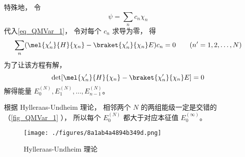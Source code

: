 特殊地， 令
\begin{equation}
\psi = \sum_n c_n \chi_n
\end{equation}
代入\autoref{eq_QMVar_1}， 令对每个 $c_n$ 求导为零， 得
\begin{equation}
\sum_n (\mel{\chi_n'}{H}{\chi_n} - \braket{\chi_n'}{\chi_n}E)c_n = 0 \qquad (n' = 1,2,\dots,N)
\end{equation}
为了让该方程有解，
\begin{equation}
\det[\mel{\chi_n'}{H}{\chi_n} - \braket{\chi_n'}{\chi_n}E] = 0
\end{equation}
解得能量 $E_0^{(N)}, E_1^{(N)},\dots,E_{n-1}^{(N)}$。

根据 Hylleraas-Undheim 理论， 相邻两个 $N$ 的两组能级一定是交错的（\autoref{fig_QMVar_1} ）， 所以每个 $E_0^{(N)}$ 都大于对应本征值 $E_0^{(\infty)}$。
\begin{figure}[ht]
\centering
\texttt{[image: ./figures/8a1ab4a4894b349d.png]}
\caption{Hylleraas-Undheim 理论} \label{fig_QMVar_1}
\end{figure}
